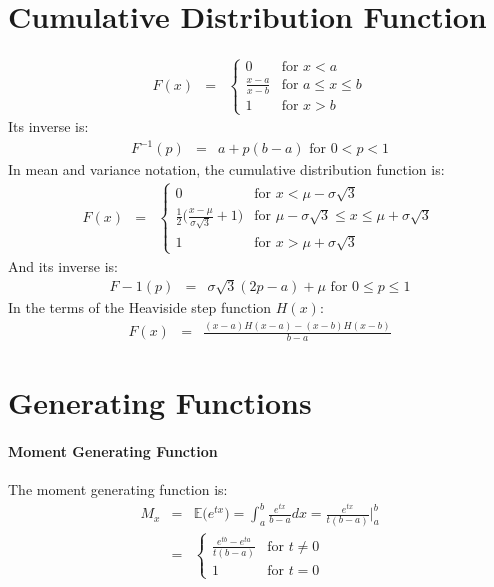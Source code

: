 \section{Cumulative Distribution Function}
\begin{eqnarray}
	F(x) &=& \begin{cases}
		0 & \text{for } x < a\\
		\frac{x - a}{x - b} & \text{for } a \leq x \leq b\\
		1 & \text{for } x > b
	\end{cases}
\end{eqnarray}
Its inverse is:
\begin{eqnarray}
	F^{-1}(p) &=& a + p(b - a) \text{ for } 0 < p < 1
\end{eqnarray}
In mean and variance notation, the cumulative distribution function is:
\begin{eqnarray}
F(x) &=& \begin{cases}
0 & \text{for } x < \mu -\sigma\sqrt{3}\\
\frac{1}{2}\Big(\frac{x - \mu}{\sigma\sqrt{3}} + 1\Big) & \text{for } \mu -\sigma\sqrt{3} \leq x \leq \mu +\sigma\sqrt{3}\\
1 & \text{for } x > \mu +\sigma\sqrt{3}
\end{cases}
\end{eqnarray}
And its inverse is:
\begin{eqnarray}
	F-1(p) &=& \sigma\sqrt{3}(2p - a) + \mu \text{ for } 0 \leq p \leq 1
\end{eqnarray}
In the terms of the Heaviside step function $H(x)$:
\begin{eqnarray}
	F(x) &=& \frac{(x - a)H(x - a) - (x - b)H(x - b)}{b - a}
\end{eqnarray}


\section{Generating Functions}

\paragraph{Moment Generating Function}
The moment generating function is:
\begin{eqnarray}
	\nonumber
	M_{x} &=& \mathbb{E}\Big(e^{tx}\Big) = \int_{a}^{b}\frac{e^{tx}}{b - a}dx = \frac{e^{tx}}{t(b - a)}\biggr\rvert_{a}^{b}\\
	&=& \begin{cases}
	\frac{e^{tb} - e^{ta}}{t(b - a)} & \text{for } t \neq 0\\
	1 & \text{for } t = 0
	\end{cases} 
\end{eqnarray}



